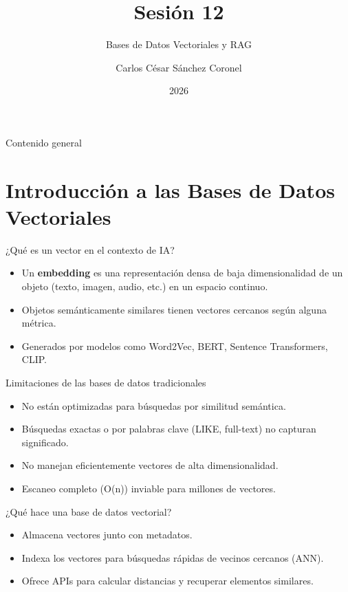 \documentclass[aspectratio=169, 10pt, xcolor=table]{beamer}
\title[SESIÓN 12 BBDD]{\textbf{Sesión 12}}
\subtitle{Bases de Datos Vectoriales y RAG}
\author[Prof. C. Sánchez]{Carlos César Sánchez Coronel}
\institute{\textbf{BASES DE DATOS}}
\date{2026}
\begin{document}
\shorthandoff{<>}

\begin{frame}
    \titlepage
\end{frame}

\begin{frame}{Contenido general}
    \tableofcontents
\end{frame}

\section{Introducción a las Bases de Datos Vectoriales}

\begin{frame}{¿Qué es un vector en el contexto de IA?}
    \begin{itemize}
        \item Un \textbf{embedding} es una representación densa de baja dimensionalidad de un objeto (texto, imagen, audio, etc.) en un espacio continuo.
        \item Objetos semánticamente similares tienen vectores cercanos según alguna métrica.
        \item Generados por modelos como Word2Vec, BERT, Sentence Transformers, CLIP.
    \end{itemize}
\end{frame}

\begin{frame}{Limitaciones de las bases de datos tradicionales}
    \begin{itemize}
        \item No están optimizadas para búsquedas por similitud semántica.
        \item Búsquedas exactas o por palabras clave (LIKE, full-text) no capturan significado.
        \item No manejan eficientemente vectores de alta dimensionalidad.
        \item Escaneo completo (O(n)) inviable para millones de vectores.
    \end{itemize}
\end{frame}

\begin{frame}{¿Qué hace una base de datos vectorial?}
    \begin{itemize}
        \item Almacena vectores junto con metadatos.
        \item Indexa los vectores para búsquedas rápidas de vecinos cercanos (ANN).
        \item Ofrece APIs para calcular distancias y recuperar elementos similares.
    \end{itemize}
\end{frame}
\end{document}
